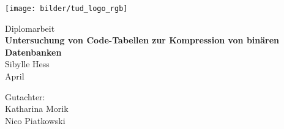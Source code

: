 \begin{titlepage}
\vspace*{-2cm}
\newlength{\links}
\setlength{\links}{-1.5cm}
\sffamily
\hspace*{\links}
\begin{minipage}{12.5cm}
\texttt{[image: bilder/tud\_logo\_rgb]}
\end{minipage}

\vspace*{4cm}

\hspace*{\links}
\hspace*{-0.2cm}
\begin{minipage}{9cm}
\large
\begin{center}
{\Large Diplomarbeit} \\
\vspace*{1cm}
\textbf{Untersuchung von Code-Tabellen zur Kompression von binären Datenbanken} \\
\vspace*{1cm}
Sibylle Hess\\
April
\end{center}
\end{minipage}
\normalsize
\vspace*{5.5cm}


\vspace*{2.1cm}

\hspace*{\links}
\begin{minipage}[b]{5cm}
\raggedright
Gutachter: \\
Katharina Morik \\
Nico Piatkowski \\
\end{minipage}


\end{titlepage}
